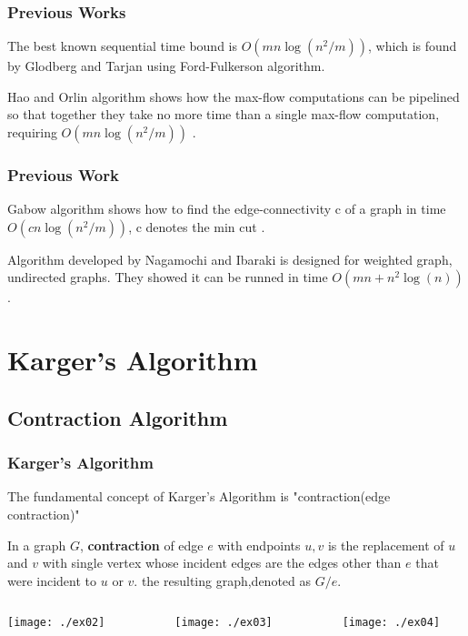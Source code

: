 \documentclass[compress,blue]{beamer}
\begin{document}
	\begin{frame}[c] %
	\frametitle{Previous Works}
	The best known sequential time bound is $ O(mn \log (n^2/m)) $, which is found by Glodberg and Tarjan  using Ford-Fulkerson algorithm.
		
	\vspace{2em}	
	Hao and Orlin algorithm shows how the max-flow computations can be pipelined so that together they take no more time than a single max-flow computation, requiring $ O(mn \log(n^2/m)) $ .
	\end{frame}
	
	\begin{frame}[c]
	\frametitle{Previous Work}
	Gabow algorithm shows how to find the edge-connectivity c of a graph in time $ O(cn\log(n^2/m)) $, c denotes the min cut .
	
	\vspace{2em}
	Algorithm developed by Nagamochi and Ibaraki is designed for weighted graph, undirected graphs. They showed it can be runned in time $ O(mn+n^2\log(n)) $ .
	\end{frame}
	
\section{Karger's Algorithm}
	\subsection{Contraction Algorithm}
	 
	\begin{frame}[c]
	\frametitle{Karger's Algorithm}
	The fundamental concept of Karger's Algorithm is "contraction(edge contraction)"
	\begin{definition}
	In a graph $ G $, \textbf{contraction} of edge $ e $ with endpoints $ u,v $ is the replacement of $ u $ and $ v $ with single vertex whose incident edges are the edges other than $ e $ that were incident to $ u $ or $ v $. the resulting graph,denoted as $ G/e $.
	\end{definition}
	
	\pause
	\vspace{2em}
	\begin{columns}
		\begin{column}{0.2\textwidth}
			\centering
			\texttt{[image: ./ex02]}
			\label{fig:ex02}
		\end{column}
		~
		\begin{column}{0.2\textwidth}
			\centering
			\texttt{[image: ./ex03]}
			\label{fig:contract xy}
		\end{column}
		~
		\begin{column}{0.2\textwidth}
			\centering
			\texttt{[image: ./ex04]}
			\label{fig:after contraction}
		\end{column}
	\end{columns}
	\end{frame}
	
\end{document}
